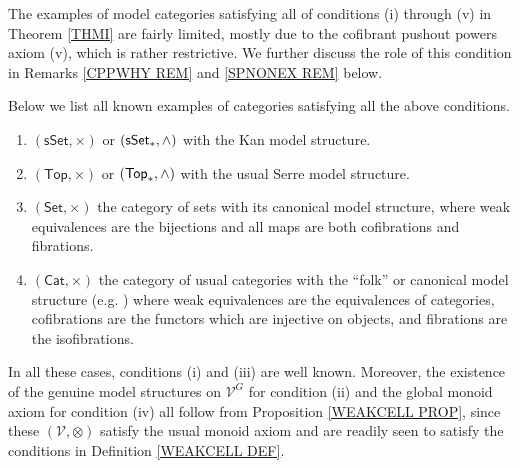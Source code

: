 \documentclass[a4paper,10pt
]{article}%
\numberwithin{equation}{section}
\numberwithin{figure}{section}
\theoremstyle{definition} %
\newcommand{\Cat}{\mathsf{Cat}}
\newcommand{\V}{\ensuremath{\mathcal V}}
\newcommand{\1}{\ensuremath{\mathbbm 1}}%
\begin{document}
The examples of 
model categories satisfying 
all of conditions (i) through (v)
in Theorem \ref{THMI}
are fairly limited, 
mostly due to 
the cofibrant pushout powers axiom (v),
which is rather restrictive.
We further discuss the role of this condition 
in Remarks 
\ref{CPPWHY REM} and
\ref{SPNONEX REM} below.

Below we list all known examples of categories satisfying all the above conditions.
\begin{enumerate}[label = (\alph*)]
\item $(\mathsf{sSet},\times)$ or $(\mathsf{sSet}_{\**},\wedge)$
with the Kan model structure.
\item $(\mathsf{Top},\times)$ or $(\mathsf{Top}_{\**},\wedge)$
with the usual Serre model structure.
\item $(\mathsf{Set},\times)$ the category of sets with its canonical model structure,
where weak equivalences are the bijections and all maps are both cofibrations and fibrations.
\item $(\Cat,\times)$ the category of usual categories
with the ``folk'' or canonical model structure (e.g. \cite{Rez})
where weak equivalences are the equivalences of categories,
cofibrations are the functors which are injective on objects,
and fibrations are the isofibrations.
\end{enumerate}
In all these cases, conditions (i) and (iii) %
are well known.
Moreover,
the existence of the genuine model structures on $\V^G$ for condition (ii)
and the global monoid axiom for condition (iv)
all follow from Proposition \ref{WEAKCELL PROP},
since these $(\V,\otimes)$ satisfy the usual monoid axiom and
are readily seen to satisfy the conditions in Definition \ref{WEAKCELL DEF}.
\end{document}
